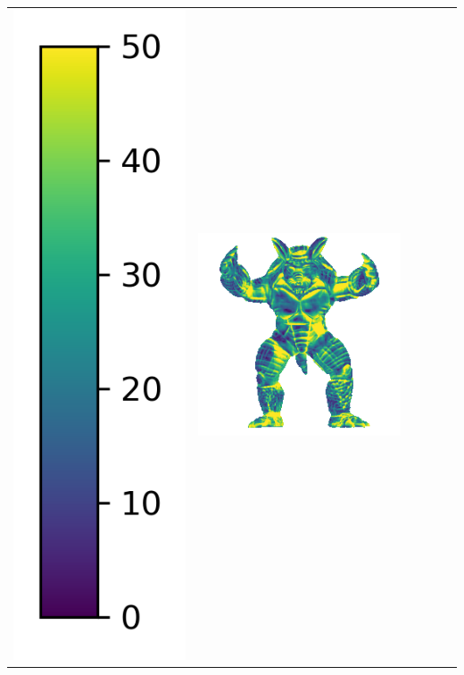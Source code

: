 \begin{tabularx}{\linewidth}{@{}Y@{}Y@{}Y@{}Y@{}Y@{}Y@{}}
\includegraphics[width=0.2\linewidth]{semisynthetic/colorbar_error_vertical.png} &
\includegraphics[width=\linewidth]{semisynthetic/20160617_22_ours_err.png} &

\end{tabularx}
